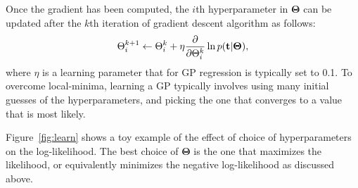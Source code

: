 Once the gradient has been computed, the $i$th hyperparameter in ${\boldsymbol \Theta}$
can be updated after the $k$th iteration of gradient descent algorithm as follows:
\begin{align*}
  { \Theta}_i^{k+1} \gets { \Theta}_i^k + \eta \frac{\partial}{\partial
    \Theta_i^{k}} \ln p({\bf t} | {\boldsymbol \Theta}),
\end{align*}
where $\eta$ is a learning parameter that for \ac{GP} regression is typically set to 0.1.
To overcome local-minima, learning a \ac{GP} typically involves using many initial guesses
of the hyperparameters, and picking the one that converges to a value that is most likely.

Figure~\ref{fig:learn} shows a toy example of the effect of choice of hyperparameters on
the log-likelihood.  The best choice of ${\boldsymbol \Theta}$ is the one that maximizes
the likelihood, or equivalently minimizes the negative log-likelihood as discussed above.

